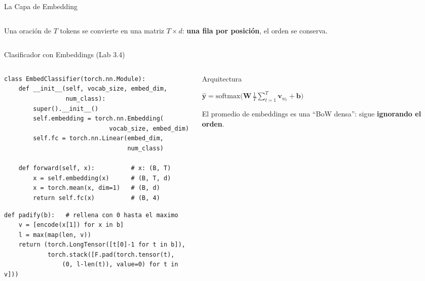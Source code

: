 \documentclass[aspectratio=169, 10pt]{beamer}
\newcommand{\formula}[1]{%
	\begin{tcolorbox}[colback=UCMBlue!8, colframe=UCMBlue, arc=4pt,
		boxsep=2pt, left=6pt, right=6pt, top=3pt, bottom=3pt]
		#1
	\end{tcolorbox}
}
\begin{document}
\begin{frame}{La Capa de Embedding}
\begin{columns}[c]
\begin{column}{0.47\textwidth}
			\vspace{0.3cm}

			{\small Una oraci\'on de $T$ tokens se convierte en una matriz $T \times d$: \textbf{una fila por posici\'on}, el orden se conserva.}
		\end{column}
	\end{columns}

\end{frame}

\begin{frame}{Clasificador con Embeddings (Lab 3.4)}

	\begin{columns}[T]
		\begin{column}{0.53\textwidth}
			\begin{tcolorbox}[codebox]
\scriptsize
\begin{verbatim}
class EmbedClassifier(torch.nn.Module):
    def __init__(self, vocab_size, embed_dim,
                 num_class):
        super().__init__()
        self.embedding = torch.nn.Embedding(
                             vocab_size, embed_dim)
        self.fc = torch.nn.Linear(embed_dim,
                                  num_class)

    def forward(self, x):          # x: (B, T)
        x = self.embedding(x)      # (B, T, d)
        x = torch.mean(x, dim=1)   # (B, d)
        return self.fc(x)          # (B, 4)
\end{verbatim}
			\end{tcolorbox}

			\begin{tcolorbox}[codebox]
\scriptsize
\begin{verbatim}
def padify(b):   # rellena con 0 hasta el maximo
    v = [encode(x[1]) for x in b]
    l = max(map(len, v))
    return (torch.LongTensor([t[0]-1 for t in b]),
            torch.stack([F.pad(torch.tensor(t),
                (0, l-len(t)), value=0) for t in v]))
\end{verbatim}
			\end{tcolorbox}
		\end{column}

		\begin{column}{0.44\textwidth}
			\begin{block}{Arquitectura}
				\formula{\centering $\hat{\mathbf{y}} = \mathrm{softmax}\Big(\mathbf{W}\,\frac{1}{T}\sum_{t=1}^{T}\mathbf{v}_{w_t} + \mathbf{b}\Big)$}
				\small
				El promedio de embeddings es una ``BoW densa'': sigue \textbf{ignorando el orden}.
			\end{block}


\end{column}
\end{columns}
\end{frame}
\end{document}
